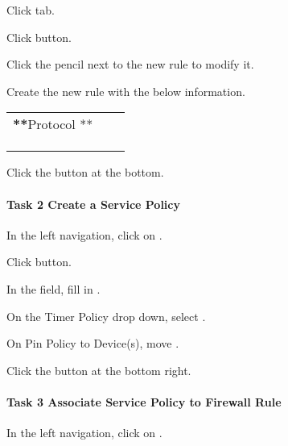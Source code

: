 \documentclass[letterpaper,10pt,english]{sphinxmanual}
\begin{document}
Click  tab.

Click  button.

Click the pencil next to the new rule to modify it.

Create the new rule with the below information.


\begin{savenotes}\sphinxattablestart
\centering
\begin{tabulary}{\linewidth}[t]{|T|T|T|}
\hline

&
&\\
\hline
{\color{red}\bfseries{}**}Protocol **
&
&\\
\hline
{}
&
&
\\
\hline
{}
&
&
\\
\hline
{}
&
&\\
\hline
\end{tabulary}
\par
\sphinxattableend\end{savenotes}

Click the  button at the bottom.


\paragraph{Task 2 \textendash{} Create a Service Policy}
\label{\detokenize{class1/module5/lab2:task-2-create-a-service-policy}}
In the left navigation, click on .

Click  button.

In the  field, fill in .

On the Timer Policy drop down, select .

On Pin Policy to Device(s), move .

Click the  button at the bottom right.


\paragraph{Task 3 \textendash{} Associate Service Policy to Firewall Rule}
\label{\detokenize{class1/module5/lab2:task-3-associate-service-policy-to-firewall-rule}}
In the left navigation, click on .
\end{document}
